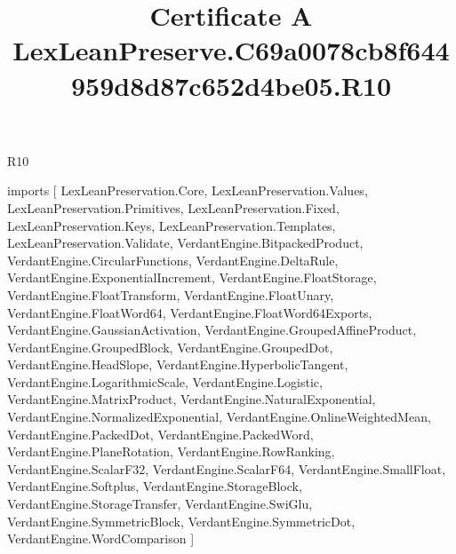 \begin{lexlean}{R10}
\title{Certificate A LexLeanPreserve.C69a0078cb8f644959d8d87c652d4be05.R10}
\begin{coremodule}
imports [
  LexLeanPreservation.Core,
  LexLeanPreservation.Values,
  LexLeanPreservation.Primitives,
  LexLeanPreservation.Fixed,
  LexLeanPreservation.Keys,
  LexLeanPreservation.Templates,
  LexLeanPreservation.Validate,
  VerdantEngine.BitpackedProduct,
  VerdantEngine.CircularFunctions,
  VerdantEngine.DeltaRule,
  VerdantEngine.ExponentialIncrement,
  VerdantEngine.FloatStorage,
  VerdantEngine.FloatTransform,
  VerdantEngine.FloatUnary,
  VerdantEngine.FloatWord64,
  VerdantEngine.FloatWord64Exports,
  VerdantEngine.GaussianActivation,
  VerdantEngine.GroupedAffineProduct,
  VerdantEngine.GroupedBlock,
  VerdantEngine.GroupedDot,
  VerdantEngine.HeadSlope,
  VerdantEngine.HyperbolicTangent,
  VerdantEngine.LogarithmicScale,
  VerdantEngine.Logistic,
  VerdantEngine.MatrixProduct,
  VerdantEngine.NaturalExponential,
  VerdantEngine.NormalizedExponential,
  VerdantEngine.OnlineWeightedMean,
  VerdantEngine.PackedDot,
  VerdantEngine.PackedWord,
  VerdantEngine.PlaneRotation,
  VerdantEngine.RowRanking,
  VerdantEngine.ScalarF32,
  VerdantEngine.ScalarF64,
  VerdantEngine.SmallFloat,
  VerdantEngine.Softplus,
  VerdantEngine.StorageBlock,
  VerdantEngine.StorageTransfer,
  VerdantEngine.SwiGlu,
  VerdantEngine.SymmetricBlock,
  VerdantEngine.SymmetricDot,
  VerdantEngine.WordComparison
]


\end{coremodule}
\end{lexlean}
